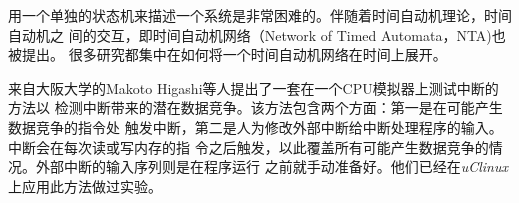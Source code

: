 用一个单独的状态机来描述一个系统是非常困难的。伴随着时间自动机理论，时间自动机之
间的交互，即时间自动机网络（Network of Timed Automata，NTA)也被提出。
\cite{Alur:1994:TTA:180782.180519}\cite{Bouyer06timedunfoldings}
很多研究都集中在如何将一个时间自动机网络在时间上展开。\cite{Bouyer06timedunfoldings}




来自大阪大学的Makoto Higashi等人提出了一套在一个CPU模拟器上测试中断的方法以
检测中断带来的潜在数据竞争。该方法包含两个方面：第一是在可能产生数据竞争的指令处
触发中断，第二是人为修改外部中断给中断处理程序的输入。中断会在每次读或写内存的指
令之后触发，以此覆盖所有可能产生数据竞争的情况。外部中断的输入序列则是在程序运行
之前就手动准备好。他们已经在\emph{uClinux}上应用此方法做过实验。\cite{Higashi:2010:EMC:1808266.1808278}

